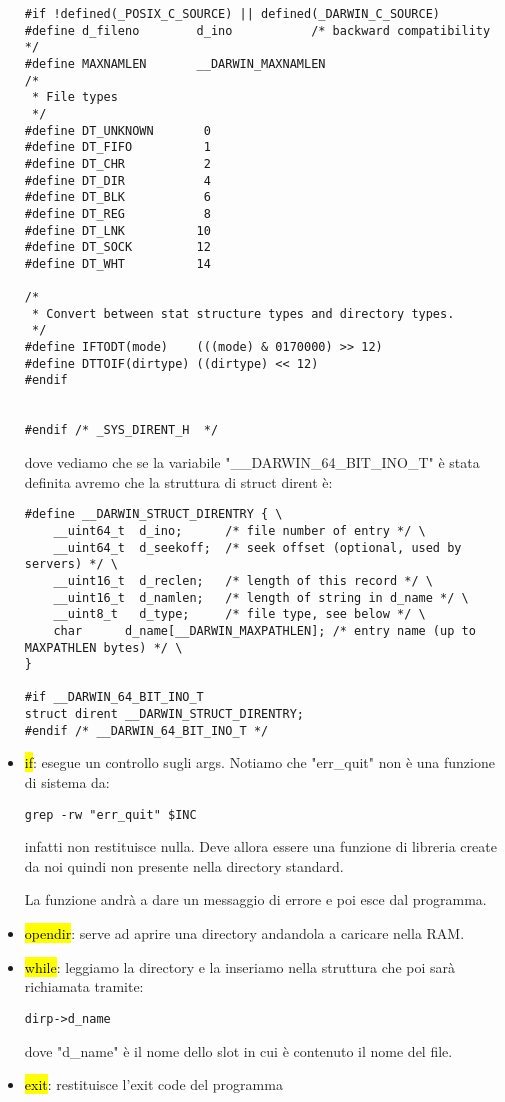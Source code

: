 \begin{itemize}
\begin{lstlisting}
#if !defined(_POSIX_C_SOURCE) || defined(_DARWIN_C_SOURCE)
#define d_fileno        d_ino           /* backward compatibility */
#define MAXNAMLEN       __DARWIN_MAXNAMLEN
/*
 * File types
 */
#define DT_UNKNOWN       0
#define DT_FIFO          1
#define DT_CHR           2
#define DT_DIR           4
#define DT_BLK           6
#define DT_REG           8
#define DT_LNK          10
#define DT_SOCK         12
#define DT_WHT          14

/*
 * Convert between stat structure types and directory types.
 */
#define IFTODT(mode)    (((mode) & 0170000) >> 12)
#define DTTOIF(dirtype) ((dirtype) << 12)
#endif


#endif /* _SYS_DIRENT_H  */
\end{lstlisting}

		dove vediamo che se la variabile "\_\_DARWIN\_64\_BIT\_INO\_T" è stata definita avremo che la struttura di struct dirent è:
		
\begin{lstlisting}
#define __DARWIN_STRUCT_DIRENTRY { \
	__uint64_t  d_ino;      /* file number of entry */ \
	__uint64_t  d_seekoff;  /* seek offset (optional, used by servers) */ \
	__uint16_t  d_reclen;   /* length of this record */ \
	__uint16_t  d_namlen;   /* length of string in d_name */ \
	__uint8_t   d_type;     /* file type, see below */ \
	char      d_name[__DARWIN_MAXPATHLEN]; /* entry name (up to MAXPATHLEN bytes) */ \
}

#if __DARWIN_64_BIT_INO_T
struct dirent __DARWIN_STRUCT_DIRENTRY;
#endif /* __DARWIN_64_BIT_INO_T */
\end{lstlisting}

		
	\item \hl{if}: esegue un controllo sugli args. Notiamo che "err\_quit" non è una funzione di sistema da:
	
\begin{lstlisting}
grep -rw "err_quit" $INC
\end{lstlisting}

		infatti non restituisce nulla. Deve allora essere una funzione di libreria create da noi quindi non presente nella directory standard.
		
		La funzione andrà a dare un messaggio di errore e poi esce dal programma.
		
		
	\item \hl{opendir}: serve ad aprire una directory andandola a caricare nella RAM. 
	
	\item \hl{while}: leggiamo la directory e la inseriamo nella struttura che poi sarà richiamata tramite:
	
\begin{lstlisting}
dirp->d_name
\end{lstlisting}

		dove "d\_name" è il nome dello slot in cui è contenuto il nome del file.
		
		
	\item \hl{exit}: restituisce l'exit code del programma
	
\end{itemize}


